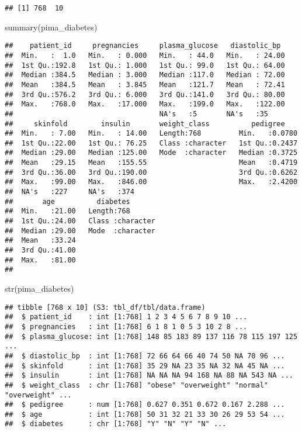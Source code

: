 \documentclass[
]{article}
\newenvironment{Shaded}{\begin{snugshade}}{\end{snugshade}}
\newcommand{\FunctionTok}[1]{\textcolor[rgb]{0.00,0.00,0.00}{#1}}
\newcommand{\NormalTok}[1]{#1}
\begin{document}
\begin{verbatim}
## [1] 768  10
\end{verbatim}

\begin{Shaded}
\begin{Highlighting}[]
\FunctionTok{summary}\NormalTok{(pima\_diabetes)}
\end{Highlighting}
\end{Shaded}

\begin{verbatim}
##    patient_id     pregnancies     plasma_glucose   diastolic_bp   
##  Min.   :  1.0   Min.   : 0.000   Min.   : 44.0   Min.   : 24.00  
##  1st Qu.:192.8   1st Qu.: 1.000   1st Qu.: 99.0   1st Qu.: 64.00  
##  Median :384.5   Median : 3.000   Median :117.0   Median : 72.00  
##  Mean   :384.5   Mean   : 3.845   Mean   :121.7   Mean   : 72.41  
##  3rd Qu.:576.2   3rd Qu.: 6.000   3rd Qu.:141.0   3rd Qu.: 80.00  
##  Max.   :768.0   Max.   :17.000   Max.   :199.0   Max.   :122.00  
##                                   NA's   :5       NA's   :35      
##     skinfold        insulin       weight_class          pedigree     
##  Min.   : 7.00   Min.   : 14.00   Length:768         Min.   :0.0780  
##  1st Qu.:22.00   1st Qu.: 76.25   Class :character   1st Qu.:0.2437  
##  Median :29.00   Median :125.00   Mode  :character   Median :0.3725  
##  Mean   :29.15   Mean   :155.55                      Mean   :0.4719  
##  3rd Qu.:36.00   3rd Qu.:190.00                      3rd Qu.:0.6262  
##  Max.   :99.00   Max.   :846.00                      Max.   :2.4200  
##  NA's   :227     NA's   :374                                         
##       age          diabetes        
##  Min.   :21.00   Length:768        
##  1st Qu.:24.00   Class :character  
##  Median :29.00   Mode  :character  
##  Mean   :33.24                     
##  3rd Qu.:41.00                     
##  Max.   :81.00                     
## 
\end{verbatim}

\begin{Shaded}
\begin{Highlighting}[]
\FunctionTok{str}\NormalTok{(pima\_diabetes)}
\end{Highlighting}
\end{Shaded}

\begin{verbatim}
## tibble [768 x 10] (S3: tbl_df/tbl/data.frame)
##  $ patient_id    : int [1:768] 1 2 3 4 5 6 7 8 9 10 ...
##  $ pregnancies   : int [1:768] 6 1 8 1 0 5 3 10 2 8 ...
##  $ plasma_glucose: int [1:768] 148 85 183 89 137 116 78 115 197 125 ...
##  $ diastolic_bp  : int [1:768] 72 66 64 66 40 74 50 NA 70 96 ...
##  $ skinfold      : int [1:768] 35 29 NA 23 35 NA 32 NA 45 NA ...
##  $ insulin       : int [1:768] NA NA NA 94 168 NA 88 NA 543 NA ...
##  $ weight_class  : chr [1:768] "obese" "overweight" "normal" "overweight" ...
##  $ pedigree      : num [1:768] 0.627 0.351 0.672 0.167 2.288 ...
##  $ age           : int [1:768] 50 31 32 21 33 30 26 29 53 54 ...
##  $ diabetes      : chr [1:768] "Y" "N" "Y" "N" ...
\end{verbatim}
\end{document}
